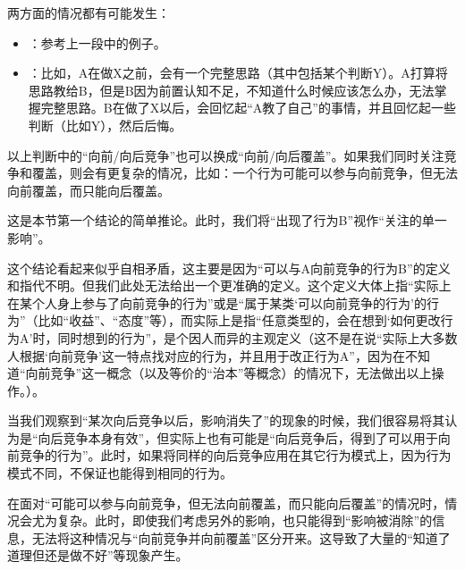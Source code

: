 \begin{explain}
两方面的情况都有可能发生：
\begin{itemize}
\item {}：参考上一段中的例子。%
\item {}：比如，A在做X之前，会有一个完整思路（其中包括某个判断Y）。A打算将思路教给B，但是B因为前置认知不足，不知道什么时候应该怎么办，无法掌握完整思路。B在做了X以后，会回忆起“A教了自己”的事情，并且回忆起一些判断（比如Y），然后后悔。
\end{itemize}
以上判断中的“向前/向后竞争”也可以换成“向前/向后覆盖”。如果我们同时关注竞争和覆盖，则会有更复杂的情况，比如：一个行为可能可以参与向前竞争，但无法向前覆盖，而只能向后覆盖。
\end{explain}
\begin{explain}
这是本节第一个结论的简单推论。此时，我们将“出现了行为B”视作“关注的单一影响”。

这个结论看起来似乎自相矛盾，这主要是因为“可以与A向前竞争的行为B”的定义和指代不明。但我们此处无法给出一个更准确的定义。这个定义大体上指“实际上在某个人身上参与了向前竞争的行为”或是“属于某类‘可以向前竞争的行为’的行为”（比如“收益”、“态度”等），而实际上是指“任意类型的，会在想到‘如何更改行为A’时，同时想到的行为”，是个因人而异的主观定义（这不是在说“实际上大多数人根据‘向前竞争’这一特点找对应的行为，并且用于改正行为A”，因为在不知道“向前竞争”这一概念（以及等价的“治本”等概念）的情况下，无法做出以上操作。）。

当我们观察到“某次向后竞争以后，影响消失了”的现象的时候，我们很容易将其认为是“向后竞争本身有效”，但实际上也有可能是“向后竞争后，得到了可以用于向前竞争的行为”。此时，如果将同样的向后竞争应用在其它行为模式上，因为行为模式不同，不保证也能得到相同的行为。

在面对“可能可以参与向前竞争，但无法向前覆盖，而只能向后覆盖”的情况时，情况会尤为复杂。此时，即使我们考虑另外的影响，也只能得到“影响被消除”的信息，无法将这种情况与“向前竞争并向前覆盖”区分开来。这导致了大量的“知道了道理但还是做不好”等现象产生。
\end{explain}

